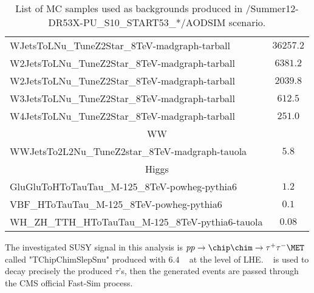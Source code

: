 \begin{table}[!Hhtb]
\begin{center}
{\begin{tabular}{|l|c|}
WJetsToLNu\_TuneZ2Star\_8TeV-madgraph-tarball          &  $36257.2$              \\
W2JetsToLNu\_TuneZ2Star\_8TeV-madgraph-tarball         &  $6381.2$               \\
W2JetsToLNu\_TuneZ2Star\_8TeV-madgraph-tarball         &  $2039.8$               \\
W3JetsToLNu\_TuneZ2Star\_8TeV-madgraph-tarball         &  $612.5$               \\
W4JetsToLNu\_TuneZ2Star\_8TeV-madgraph-tarball         &  $251.0$                \\
\hline
\multicolumn{2}{|c|}{WW}\\
\hline
WWJetsTo2L2Nu\_TuneZ2star\_8TeV-madgraph-tauola        &  $5.8$                \\

\hline
\multicolumn{2}{|c|}{Higgs}\\
\hline
GluGluToHToTauTau\_M-125\_8TeV-powheg-pythia6          &  $1.2$                \\
VBF\_HToTauTau\_M-125\_8TeV-powheg-pythia6             &  $0.1$                \\
WH\_ZH\_TTH\_HToTauTau\_M-125\_8TeV-pythia6-tauola     &  $0.08$\\

\hline

\end{tabular}
}
\end{center}

\caption{List of MC samples used as backgrounds produced in /Summer12-DR53X-PU\_S10\_START53\_*/AODSIM scenario.}
\label{Tab.MCSamples}
\end{table}

The investigated SUSY signal in this analysis is {\small $pp \rightarrow \chip \chim \rightarrow \tau^+ \tau^- \MET$} called {\small "TChipChimSlepSnu"} produced with \PYTHIA $6.4$ ~\cite{PYTHIA} at the level of LHE. \TAUOLA ~\cite{TAUOLA} is used to decay precisely the produced $\tau$'s, then the generated events are passed through the CMS official Fast-Sim process.

